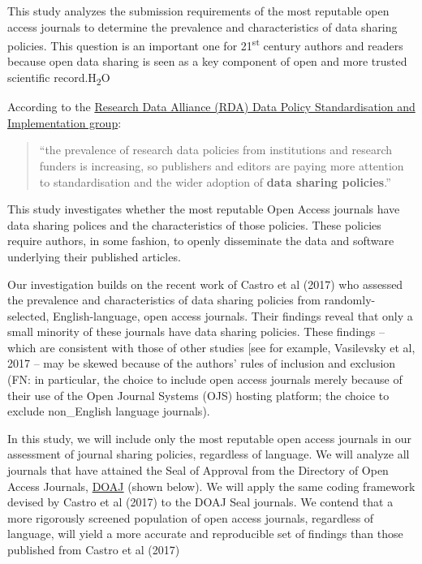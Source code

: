 \documentclass[]{article}
\begin{document}
This study analyzes the submission requirements of the most reputable
open access journals to determine the prevalence and characteristics of
data sharing policies. This question is an important one for
21\textsuperscript{st} century authors and readers because open data
sharing is seen as a key component of open and more trusted scientific
record.H\textsubscript{2}O

According to the
\href{https://www.rd-alliance.org/groups/data-policy-standardisation-and-implementation}{Research
Data Alliance (RDA) Data Policy Standardisation and Implementation
group}:

\begin{quote}
``the prevalence of research data policies from institutions and
research funders is increasing, so publishers and editors are paying
more attention to standardisation and the wider adoption of \textbf{data
sharing policies}.''
\end{quote}

This study investigates whether the most reputable Open Access journals
have data sharing polices and the characteristics of those policies.
These policies require authors, in some fashion, to openly disseminate
the data and software underlying their published articles.

Our investigation builds on the recent work of Castro et al (2017) who
assessed the prevalence and characteristics of data sharing policies
from randomly-selected, English-language, open access journals. Their
findings reveal that only a small minority of these journals have data
sharing policies. These findings -- which are consistent with those of
other studies {[}see for example, Vasilevsky et al, 2017 -- may be
skewed because of the authors' rules of inclusion and exclusion (FN: in
particular, the choice to include open access journals merely because of
their use of the Open Journal Systems (OJS) hosting platform; the choice
to exclude non\_English language journals).

In this study, we will include only the most reputable open access
journals in our assessment of journal sharing policies, regardless of
language. We will analyze all journals that have attained the Seal of
Approval from the Directory of Open Access Journals,
\href{http://doaj.org}{DOAJ} (shown below). We will apply the same
coding framework devised by Castro et al (2017) to the DOAJ Seal
journals. We contend that a more rigorously screened population of open
access journals, regardless of language, will yield a more accurate and
reproducible set of findings than those published from Castro et al
(2017)
\end{document}
